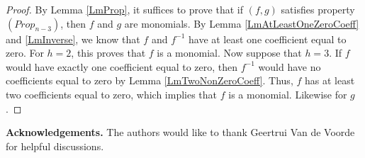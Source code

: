 \documentclass[a4paper]{article}
\theoremstyle{definition}
\begin{document}
\begin{proof}
By Lemma \ref{LmProp}, it suffices to prove that if $(f,g)$ satisfies property $(Prop_{n-3})$, then $f$ and $g$ are monomials.
By Lemma \ref{LmAtLeastOneZeroCoeff} and \ref{LmInverse}, we know that $f$ and $f^{-1}$ have at least one coefficient equal to zero.
For $h=2$, this proves that $f$ is a monomial.
Now suppose that $h=3$.
If $f$ would have exactly one coefficient equal to zero, then $f^{-1}$ would have no coefficients equal to zero by Lemma \ref{LmTwoNonZeroCoeff}.
Thus, $f$ has at least two coefficients equal to zero, which implies that $f$ is a monomial.
Likewise for $g$.
\end{proof}

\bigskip

\noindent \textbf{Acknowledgements.}
The authors would like to thank Geertrui Van de Voorde for helpful discussions.




\end{document}
